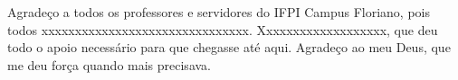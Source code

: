 \begin{agradecimentos}
Agradeço a todos os professores e servidores do IFPI Campus Floriano, pois todos xxxxxxxxxxxxxxxxxxxxxxxxxxxxxxx. Xxxxxxxxxxxxxxxxxxx, que deu todo o apoio necessário para que chegasse até aqui. Agradeço ao meu Deus, que me deu força quando mais precisava.
\end{agradecimentos}